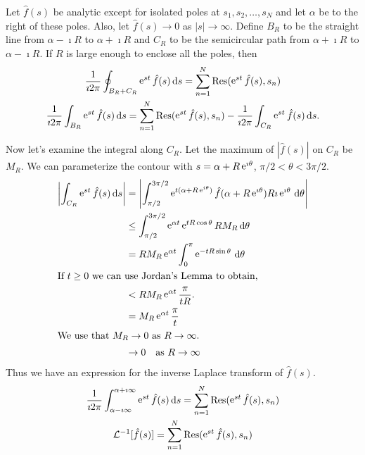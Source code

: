 Let $\hat{f}(s)$ be analytic except for isolated poles at $s_1, s_2, \ldots,s_N$ and
let $\alpha$ be to the right of these poles.  Also, let $\hat{f}(s) \to 0$ as 
$|s| \to \infty$.  Define $B_R$ to be the straight line from $\alpha - \imath R$
to $\alpha + \imath R$ and $C_R$ to be the semicircular path from
$\alpha + \imath R$ to $\alpha - \imath R$.  If $R$ is large enough to 
enclose all the poles, then
\begin{gather*} 
  \frac{1}{\imath 2 \pi} \oint_{B_R+C_R} \mathop{\mathrm{e}}\nolimits^{s t} \hat{f}(s)\,\mathrm{d} s 
  = \sum_{n=1}^N \mathop{\mathrm{Res}}\nolimits(\mathop{\mathrm{e}}\nolimits^{s t} \hat{f}(s), s_n) 
  \\
  \frac{1}{\imath 2 \pi} \int_{B_R} \mathop{\mathrm{e}}\nolimits^{s t} \hat{f}(s)\,\mathrm{d} s 
  = \sum_{n=1}^N \mathop{\mathrm{Res}}\nolimits(\mathop{\mathrm{e}}\nolimits^{s t} \hat{f}(s), s_n)
  - \frac{1}{\imath 2 \pi} \int_{C_R} \mathop{\mathrm{e}}\nolimits^{s t} \hat{f}(s)\,\mathrm{d} s.
\end{gather*}

Now let's examine the integral along $C_R$.  Let the maximum of $|\hat{f}(s)|$
on $C_R$ be $M_R$.  We can parameterize the contour with
$s = \alpha + R\mathop{\mathrm{e}}\nolimits^{\imath \theta}$, $\pi/2 < \theta < 3\pi/2$.
\begin{align*}
  \left| \int_{C_R} \mathop{\mathrm{e}}\nolimits^{s t} \hat{f}(s)\,\mathrm{d} s \right|
  &= \left| \int_{\pi/2}^{3\pi/2} \mathop{\mathrm{e}}\nolimits^{t(\alpha + R\mathop{\mathrm{e}}\nolimits^{i\theta})}
    \hat{f}(\alpha + R\mathop{\mathrm{e}}\nolimits^{\imath \theta}) R \imath \mathop{\mathrm{e}}\nolimits^{\imath \theta}\,\mathrm{d} \theta \right| \\
  &\leq \int_{\pi/2}^{3\pi/2} \mathop{\mathrm{e}}\nolimits^{\alpha t} \mathop{\mathrm{e}}\nolimits^{t R \cos \theta} R M_R \,\mathrm{d} \theta \\
  &= R M_R \mathop{\mathrm{e}}\nolimits^{\alpha t} \int_0^\pi \mathop{\mathrm{e}}\nolimits^{-t R \sin \theta}\,\mathrm{d} \theta \\
  \intertext{If $t \geq 0$ we can use Jordan's Lemma to obtain,}
  &< R M_R \mathop{\mathrm{e}}\nolimits^{\alpha t} \frac{\pi}{t R}. \\
  &= M_R \mathop{\mathrm{e}}\nolimits^{\alpha t} \frac{\pi}{t} \\
  \intertext{We use that $M_R \to 0$ as $R \to \infty$.}
  &\to 0 \quad \mathrm{as}\ R \to \infty
\end{align*}
Thus we have an expression for the inverse Laplace transform of $\hat{f}(s)$.
\begin{gather*}
  \frac{1}{\imath 2 \pi} \int_{\alpha - \imath \infty}^{\alpha + \imath \infty} \mathop{\mathrm{e}}\nolimits^{s t} \hat{f}(s)\,\mathrm{d} s = 
  \sum_{n=1}^N \mathop{\mathrm{Res}}\nolimits(\mathop{\mathrm{e}}\nolimits^{s t} \hat{f}(s), s_n) \\
  \mathcal{L}^{-1}[\hat{f}(s)] = \sum_{n=1}^N \mathop{\mathrm{Res}}\nolimits(\mathop{\mathrm{e}}\nolimits^{s t} \hat{f}(s), s_n)
\end{gather*}










